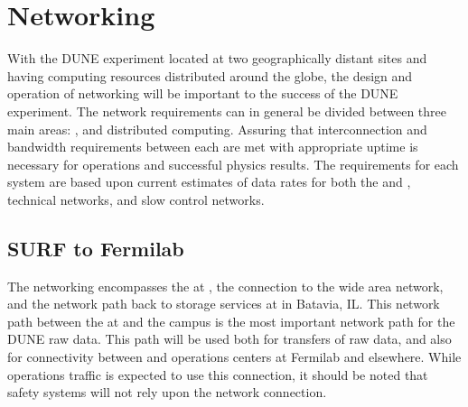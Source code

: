 \documentclass[../main-v1.tex]{subfiles}
\begin{document}
\chapter{Networking }
\label{ch:netw}





With the DUNE experiment located at two geographically distant sites and having computing resources distributed around the globe, the design and operation of networking will be important to the success of the DUNE experiment. The network requirements can in general be divided between three main areas: %
,  and distributed computing. Assuring that interconnection and bandwidth requirements between each are met with appropriate uptime is necessary for operations and successful physics results. The requirements for each system are based upon current estimates of data rates for both the  and  , technical networks, and slow control networks.

\section{SURF to Fermilab}

The  networking encompasses the  at , the connection to the wide area network, and the network path back to storage services at  in Batavia, IL. This network path between the  at  and the  campus is the most important network path for the DUNE raw data. This path will be used both for transfers of raw data, and also for connectivity between  and operations centers at Fermilab and elsewhere. While operations traffic is expected to use this connection, it should be noted that safety systems will not rely upon the network connection.
\end{document}
